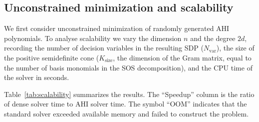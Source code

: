 \documentclass[12pt]{elsarticle}
\theoremstyle{definition}
\begin{document}
\subsection{Unconstrained minimization and scalability}\label{subsec:scalability}
We first consider unconstrained minimization of randomly generated AHI polynomials. To analyse scalability we vary the dimension $n$ and the degree $2d$, recording the number of decision variables in the resulting SDP ($N_{\mathrm{var}}$), the size of the positive semidefinite cone ($K_{\mathrm{size}}$, the dimension of the Gram matrix, equal to the number of basis monomials in the SOS decomposition), and the CPU time of the solver in seconds.

Table~\ref{tab:scalability} summarizes the results. The ``Speedup'' column is the ratio of dense solver time to AHI solver time. The symbol ``OOM'' indicates that the standard solver exceeded available memory and failed to construct the problem.

\begin{table}[h!]
\centering
{}
\caption{Comparison of standard SOS and AHI relaxations. Note that $K_{\mathrm{size}}$ in the AHI columns realizes the bound $n(n-1)+1$ of \eqref{eq:half-support}.}
\label{tab:scalability}
\end{table}
\end{document}

